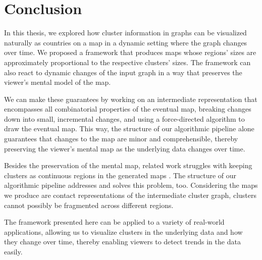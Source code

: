 \chapter{Conclusion}
\label{chap:conclusion}

In this thesis, we explored how cluster information in graphs can be visualized naturally as countries on a map in a dynamic setting where the graph changes over time.
We proposed a framework that produces maps whose regions' sizes are approximately proportional to the respective clusters' sizes.
The framework can also react to dynamic changes of the input graph in a way that preserves the viewer's mental model of the map.

We can make these guarantees by working on an intermediate representation that encompasses all combinatorial properties of the eventual map, breaking changes down into small, incremental changes, and using a force-directed algorithm to draw the eventual map.
This way, the structure of our algorithmic pipeline alone guarantees that changes to the map are minor and comprehensible, thereby preserving the viewer's mental map as the underlying data changes over time.

Besides the preservation of the mental map, related work struggles with keeping clusters as continuous regions in the generated maps \cite{gansner2009gmap} \cite{mashima2011visualizing}.
The structure of our algorithmic pipeline addresses and solves this problem, too.
Considering the maps we produce are contact representations of the intermediate cluster graph, clusters cannot possibly be fragmented across different regions.

The framework presented here can be applied to a variety of real-world applications, allowing us to visualize clusters in the underlying data and how they change over time, thereby enabling viewers to detect trends in the data easily.



